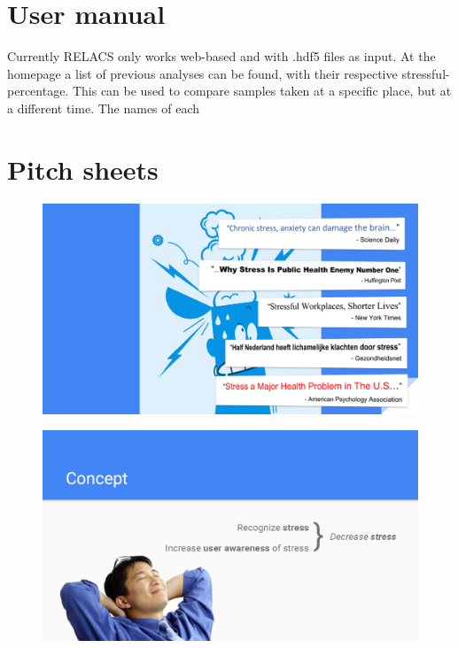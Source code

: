 \documentclass[a4paper]{article}
\begin{document}
\section{User manual}
Currently RELACS only works web-based and with .hdf5 files as input.
At the homepage a list of previous analyses can be found, with their respective stressful-percentage.
This can be used to compare samples taken at a specific place, but at a different time. The names of each 



\section{Pitch sheets}

\begin{figure}[h]
\centering
\includegraphics[width=\linewidth]{./Slide1}
\label{fig:Slide1}
\end{figure}

\begin{figure}[h]
\centering
\includegraphics[width=\linewidth]{./Slide2}
\label{fig:Slide2}
\end{figure}
\end{document}
